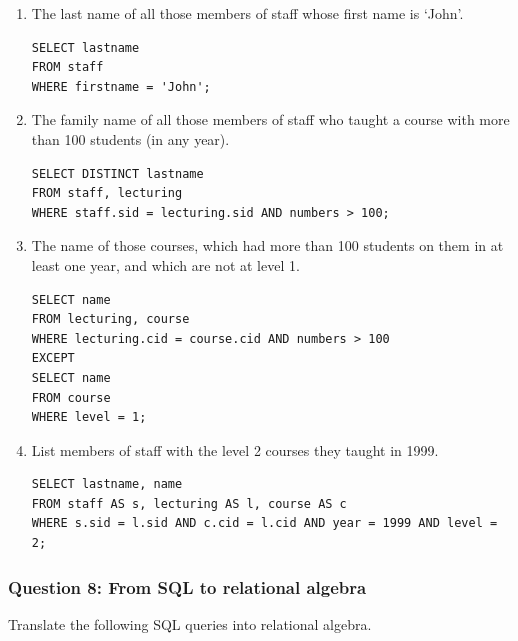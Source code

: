 \begin{enumerate}
    \item[a.] The last name of all those members of staff whose first name is ‘John’.

\begin{verbatim}
SELECT lastname
FROM staff
WHERE firstname = 'John';
\end{verbatim}

    \item[b.] The family name of all those members of staff who taught a course with more than 100 students (in any year).

\begin{verbatim}
SELECT DISTINCT lastname
FROM staff, lecturing
WHERE staff.sid = lecturing.sid AND numbers > 100;
\end{verbatim}

    \item[c.] The name of those courses, which had more than 100 students on them in at least one year, and which are not at level 1.

\begin{verbatim}
SELECT name
FROM lecturing, course
WHERE lecturing.cid = course.cid AND numbers > 100
EXCEPT
SELECT name
FROM course
WHERE level = 1;
\end{verbatim}

    \item[d.] List members of staff with the level 2 courses they taught in 1999.

\begin{verbatim}
SELECT lastname, name
FROM staff AS s, lecturing AS l, course AS c
WHERE s.sid = l.sid AND c.cid = l.cid AND year = 1999 AND level = 2;
\end{verbatim}
\end{enumerate}

\subsubsection{Question 8: From SQL to relational algebra}

Translate the following SQL queries into relational algebra.

